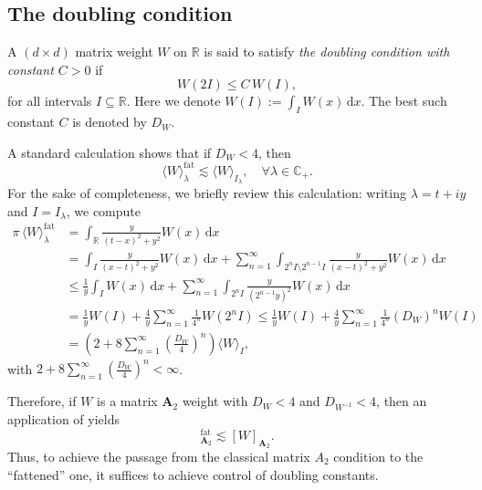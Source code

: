\documentclass{amsart}
\newcommand{\C}{\mathbb{C}}
\newcommand{\R}{\mathbb{R}}
\theoremstyle{definition}
\theoremstyle{remark}
\begin{document}
	\subsection{The doubling condition}
	
	A $(d\times d)$ matrix weight $W$ on $\R$ is said to satisfy \emph{the doubling condition with constant $C>0$} if
	\begin{equation*}
		W(2I)\leq C\,W(I),
	\end{equation*}
	for all intervals $I\subseteq\R$. Here we denote $W(I):=\int_{I}W(x)\,\mathrm{d}x$. The best such constant $C$ is denoted by $D_{W}$.
	
	A standard calculation shows that if $D_{W}<4$, then
	\begin{equation}
		\label{usual averages dominate fattened averages under doubling}
		\langle W \rangle^{\text{fat}}_{\lambda}\lesssim\langle W \rangle_{I_{\lambda}},\quad\forall\lambda\in\C_{+}.
	\end{equation}
	For the sake of completeness, we briefly review this calculation: writing $\lambda=t+iy$ and $I=I_{\lambda}$, we compute
	\begin{align*}
		\pi\,\langle W \rangle^{\text{fat}}_{\lambda}&=\int_{\R}\frac{y}{(t-x)^2+y^2}W(x)\,\mathrm{d}x\\
		&=
		\int_{I}\frac{y}{(x-t)^2+y^2}W(x)\,\mathrm{d}x+\sum_{n=1}^{\infty}\int_{2^nI\setminus 2^{n-1}I}\frac{y}{(x-t)^2+y^2}W(x)\,\mathrm{d}x\\
		&\leq\frac{1}{y}\int_{I}W(x)\,\mathrm{d}x+\sum_{n=1}^{\infty}\int_{2^nI}\frac{y}{(2^{n-1}y)^2}W(x)\,\mathrm{d}x\\
		&=\frac{1}{y} W(I)+\frac{4}{y}\sum_{n=1}^{\infty}\frac{1}{4^{n}}W(2^{n}I)
		\leq\frac{1}{y} W(I)+\frac{4}{y}\sum_{n=1}^{\infty}\frac{1}{4^{n}}(D_{W})^nW(I)\\
		&=\left(2+8\sum_{n=1}^{\infty}\left(\frac{D_{W}}{4}\right)^n\right)\langle W\rangle_{I},
	\end{align*}
	with $2+8\sum_{n=1}^{\infty}\left(\frac{D_{W}}{4}\right)^n<\infty$.
	
	Therefore, if $W$ is a matrix $\mathbf{A}_2$ weight with $D_{W}<4$ and $D_{W^{-1}}<4$, then an application of \cite[Lemma 3.1]{DoPeTrVo} yields
	\begin{equation*}
		[W]^{\text{fat}}_{\mathbf{A}_2}\lesssim[W]_{\mathbf{A}_2}.
	\end{equation*}
	Thus, to achieve the passage from the classical matrix $A_2$ condition to the ``fattened'' one, it suffices to achieve control of doubling constants.
\end{document}
